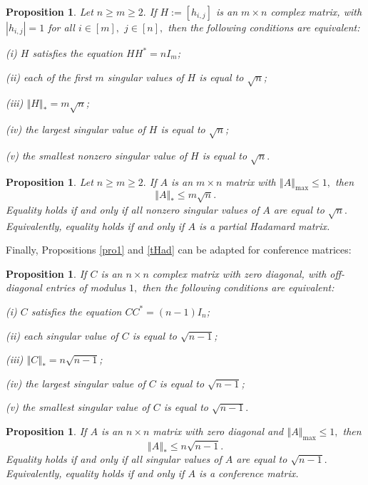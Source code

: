 \documentclass[12pt]{article}%
\newtheorem{proposition}[theorem]{Proposition}
\begin{document}
\begin{proposition}
\label{pro1mn}Let $n\geq m\geq2.$ If $H:=\left[  h_{i,j}\right]  $ is an
$m\times n$ complex matrix, with $\left\vert h_{i,j}\right\vert =1$ for all
$i\in\left[  m\right]  ,$ $j\in\left[  n\right]  ,$ then the following
conditions are equivalent:

(i) $H$ satisfies the equation $HH^{\ast}=nI_{m}$;

(ii) each of the first $m$ singular values of $H$ is equal to $\sqrt{n}$;

(iii) $\left\Vert H\right\Vert _{\ast}=m\sqrt{n}$;

(iv) the largest singular value of $H$ is equal to $\sqrt{n}$;

(v) the smallest nonzero singular value of $H$ is equal to $\sqrt{n}.$
\end{proposition}

\begin{proposition}
\label{tpHad}Let $n\geq m\geq2.$ If $A$ is an $m\times n$ matrix with
$\left\Vert A\right\Vert _{\max}\leq1,$ then%
\[
\left\Vert A\right\Vert _{\ast}\leq m\sqrt{n}.
\]
Equality holds if and only if all nonzero singular values of $A$ are equal to
$\sqrt{n}.$ Equivalently, equality holds if and only if $A$ is a partial
Hadamard matrix.
\end{proposition}

Finally, Propositions \ref{pro1} and \ref{tHad} can be adapted for conference matrices:

\begin{proposition}
\label{proC}If $C$ is an $n\times n$ complex matrix with zero diagonal, with
off-diagonal entries of modulus $1,$ then the following conditions are equivalent:

(i) $C$ satisfies the equation $CC^{\ast}=\left(  n-1\right)  I_{n}$;

(ii) each singular value of $C$ is equal to $\sqrt{n-1}$;

(iii) $\left\Vert C\right\Vert _{\ast}=n\sqrt{n-1}$;

(iv) the largest singular value of $C$ is equal to $\sqrt{n-1}$;

(v) the smallest singular value of $C$ is equal to $\sqrt{n-1}.$
\end{proposition}

\begin{proposition}
\label{tcon}If $A$ is an $n\times n$ matrix with zero diagonal and $\left\Vert
A\right\Vert _{\max}\leq1,$ then%
\[
\left\Vert A\right\Vert _{\ast}\leq n\sqrt{n-1}.
\]
Equality holds if and only if all singular values of $A$ are equal to
$\sqrt{n-1}.$ Equivalently, equality holds if and only if $A$ is a conference matrix.
\end{proposition}
\end{document}

